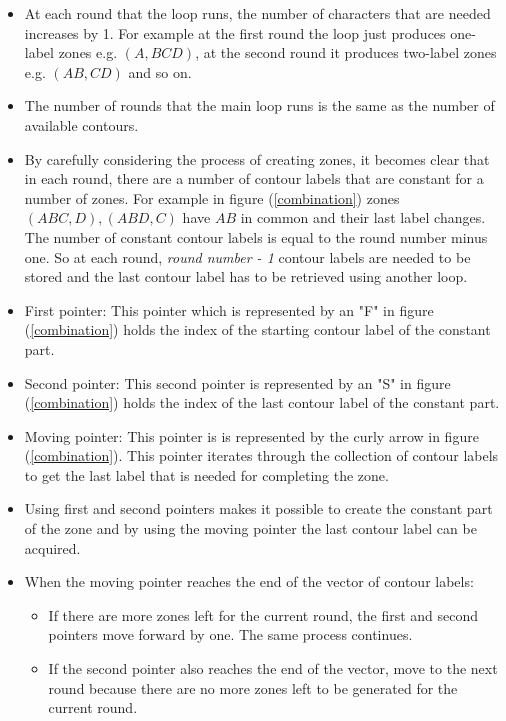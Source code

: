 \documentclass[10pt, a4paper, titlepage]{article}
\begin{document}
\begin{itemize}

\item At each round that the loop runs, the number of characters that are needed increases by 1. For example at the first round the loop just produces one-label zones e.g. $ (A, BCD) $, at the second round it produces two-label zones e.g. $ (AB, CD) $ and so on. 
\item The number of rounds that the main loop runs is the same as the number of available contours.
\item By carefully considering the process of creating zones, it becomes clear that in each round, there are a number of contour labels that are constant for a number of zones. For example in figure (\ref{combination}) zones $ (ABC, D) , ( ABD, C)  $ have $ AB $ in common and their last label changes. The number of constant contour labels is equal to the round number minus one. So at each round, \textit{ round number - 1 } contour labels are needed to be stored and the last contour label has to be retrieved using another loop.
\item First pointer: This pointer which is represented by an "F" in figure (\ref{combination}) holds the index of the starting contour label of the constant part.
\item Second pointer: This second pointer is represented by an "S" in figure (\ref{combination}) holds the index of the last contour label of the constant part.
\item Moving pointer: This pointer is is represented by the curly arrow in figure (\ref{combination}). This pointer iterates through the collection of contour labels to get the last label that is needed for completing the zone.
\item Using first and second pointers makes it possible to create the constant part of the zone and by using the moving pointer the last contour label can be acquired.
\item When the moving pointer reaches the end of the vector of contour labels:
\begin{itemize}
\item If there are more zones left for the current round, the first and second pointers move forward by one. The same process continues.
\item If the second pointer also reaches the end of the vector, move to the next round because there are no more zones left to be generated for the current round.
\end{itemize}

\end{itemize}
\end{document}
